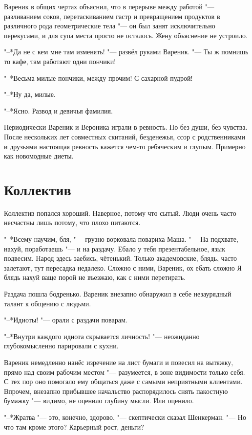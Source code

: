 Вареник в общих чертах объяснил, что в перерыве между работой "--- разливанием соков, перетаскиванием гастр и превращением продуктов в различного рода геометрические тела "--- он был занят исключительно перекусами, и для супа места просто не осталось.
Жену объяснение не устроило.

"--*Да не с кем мне там изменять! "--- развёл руками Вареник.
"--- Ты ж помнишь то кафе, там работают одни пончики!

"--*Весьма милые пончики, между прочим!
С сахарной пудрой!

"--*Ну да, милые.

"--*Ясно.
Развод и девичья фамилия.

Периодически Вареник и Вероника играли в ревность.
Но без души, без чувства.
После нескольких лет совместных скитаний, безденежья, ссор с родственниками и друзьями настоящая ревность кажется чем-то ребяческим и глупым.
Примерно как новомодные диеты.

\section{Коллектив}

Коллектив попался хороший.
Наверное, потому что сытый.
Люди очень часто несчастны лишь потому, что плохо питаются.

"--*Всему научим, бля, "--- грузно ворковала повариха Маша.
"--- На подхвате, нахуй, поработаешь "--- и на раздачу.
Ебало у тебя презентабельное, язык подвесим.
Народ здесь заебись, чётенький.
Только академовские, блядь, часто залетают, тут пересадка недалеко.
Сложно с ними, Вареник, ох ебать сложно\ldotst
Я блядь нахуй ваще порой не въезжаю, как с ними перетирать.

Раздача пошла бодренько.
Вареник внезапно обнаружил в себе незаурядный талант к общению с людьми.

"--*Идиоты! "--- орали с раздачи поварам.

"--*Внутри каждого идиота скрывается личность! "--- неожиданно глубокомысленно парировали с кухни.

Вареник немедленно нанёс изречение на лист бумаги и повесил на вытяжку, прямо над своим рабочим местом "--- разумеется, в зоне видимости только себя.
С тех пор оно помогало ему общаться даже с самыми неприятными клиентами.
Впрочем, внезапно прибывшее начальство распорядилось снять пакостную бумажку "--- видимо, не оценило глубину мысли.
Или оценило.

\spacing

"--*Жратва "--- это, конечно, здорово, "--- скептически сказал Шенкерман.
"--- Но что там кроме этого?
Карьерный рост, деньги?

